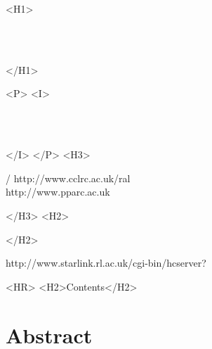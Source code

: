 \begin{htmlonly}
   \xlabel{}
   \begin{rawhtml} <H1> \end{rawhtml}
      \stardoctitle\\
      \stardocversion\\
      \stardocmanual
   \begin{rawhtml} </H1> \end{rawhtml}


   \begin{rawhtml} <P> <I> \end{rawhtml}
   \stardoccategory \stardocnumber \\
   \stardocauthors \\
   \stardocdate
   \begin{rawhtml} </I> </P> <H3> \end{rawhtml}
       /
                        {http://www.cclrc.ac.uk/ral} \\
                        {http://www.pparc.ac.uk} \\
   \begin{rawhtml} </H3> <H2> \end{rawhtml}
   \begin{rawhtml} </H2> \end{rawhtml}
      {http://www.starlink.rl.ac.uk/cgi-bin/hcserver?\stardocsource}\\

  \label{stardoccontents}
  \begin{rawhtml}
    <HR>
    <H2>Contents</H2>
  \end{rawhtml}
  \renewcommand{\latexonlytoc}[0]{}

  \section{Abstract}


\end{htmlonly}

